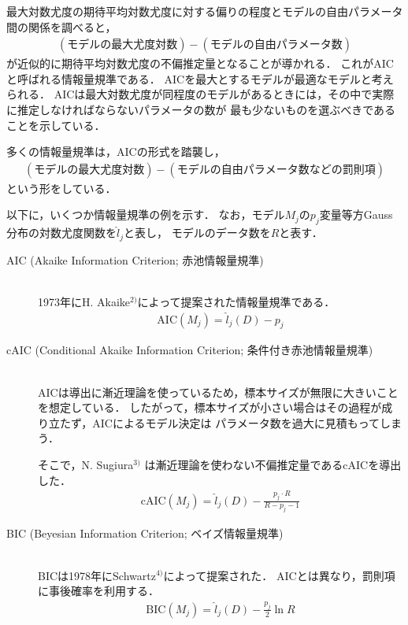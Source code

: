 最大対数尤度の期待平均対数尤度に対する偏りの程度とモデルの自由パラメータ間の関係を調べると，
\begin{align*}
  (モデルの最大尤度対数) - (モデルの自由パラメータ数)
\end{align*}
が近似的に期待平均対数尤度の不偏推定量となることが導かれる．
これがAICと呼ばれる情報量規準である．
AICを最大とするモデルが最適なモデルと考えられる．
AICは最大対数尤度が同程度のモデルがあるときには，その中で実際に推定しなければならないパラメータの数が
最も少ないものを選ぶべきであることを示している．

多くの情報量規準は，AICの形式を踏襲し，
\begin{align*}
  (モデルの最大尤度対数) - (モデルの自由パラメータ数などの罰則項)
\end{align*}
という形をしている．

以下に，いくつか情報量規準の例を示す．
なお，モデル$M_j$の$p_j$変量等方Gauss分布の対数尤度関数を$\hat{l}_j$と表し，
モデルのデータ数を$R$と表す．
\begin{description}
  \item[AIC (Akaike Information Criterion; 赤池情報量規準)]~\\
    1973年にH. Akaike$^{2)}$によって提案された情報量規準である．
    \begin{align}
      \label{eq:aic}
      \mathrm{AIC}(M_j) = \hat{l}_j(D) - p_j
    \end{align}
  \item[cAIC (Conditional Akaike Information Criterion; 条件付き赤池情報量規準)]~\\
    AICは導出に漸近理論を使っているため，標本サイズが無限に大きいことを想定している．
    したがって，標本サイズが小さい場合はその過程が成り立たず，AICによるモデル決定は
    パラメータ数を過大に見積もってしまう．

    そこで，N. Sugiura$^{3)}$ は漸近理論を使わない不偏推定量であるcAICを導出した．
    \begin{align}
      \label{eq:caic}
      \mathrm{cAIC}(M_j) = \hat{l}_j(D) - \frac{p_j \cdot R}{R-p_j-1}
    \end{align}
  \item[BIC (Beyesian Information Criterion; ベイズ情報量規準)]~\\
    BICは1978年にSchwartz$^{4)}$によって提案された．
    AICとは異なり，罰則項に事後確率を利用する．
    \begin{align}
      \label{eq:bic}
      \mathrm{BIC}(M_j) = \hat{l}_j(D) - \frac{p_j}{2}\ln R
    \end{align}
\end{description}

